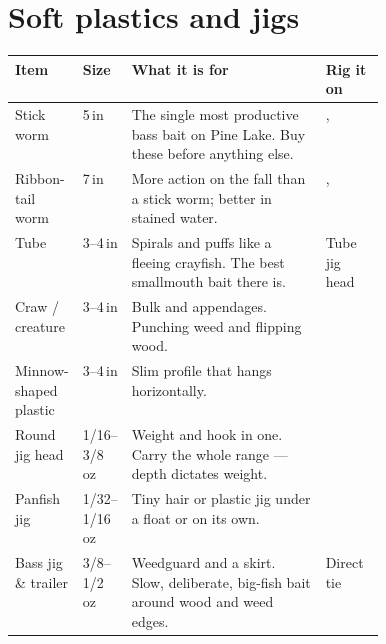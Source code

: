 \section{Soft plastics and jigs}
\begin{tabularx}{\linewidth}{@{}p{0.17\linewidth}p{0.10\linewidth}L p{0.16\linewidth}@{}}
\toprule
\textbf{Item} & \textbf{Size} & \textbf{What it is for} & \textbf{Rig it on}\\
\midrule
Stick worm & 5\,in & The single most productive bass bait on Pine Lake. Buy these before anything else. & , \\
Ribbon-tail worm & 7\,in & More action on the fall than a stick worm; better in stained water. & , \\
Tube & 3--4\,in & Spirals and puffs like a fleeing crayfish. The best smallmouth bait there is. & Tube jig head\\
Craw / creature & 3--4\,in & Bulk and appendages. Punching weed and flipping wood. & \\
Minnow-shaped plastic & 3--4\,in & Slim profile that hangs horizontally. & \\
Round jig head & 1/16--3/8\,oz & Weight and hook in one. Carry the whole range --- depth dictates weight. & \\
Panfish jig & 1/32--1/16\,oz & Tiny hair or plastic jig under a float or on its own. & \\
Bass jig \& trailer & 3/8--1/2\,oz & Weedguard and a skirt. Slow, deliberate, big-fish bait around wood and weed edges. & Direct tie\\
\bottomrule
\end{tabularx}

